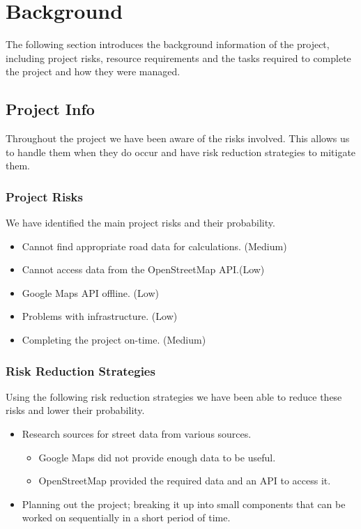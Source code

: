 \documentclass[a4paper,11pt]{article}
\begin{document}
\section{Background}

The following section introduces the background information of the project,
including project risks, resource requirements and the tasks required to
complete the project and how they were managed.

\subsection{Project Info}

Throughout the project we have been aware of the risks involved. This allows us
to handle them when they do occur and have risk reduction strategies to mitigate
them.

\subsubsection{Project Risks}

We have identified the main project risks and their probability.

\begin{itemize}
  \item Cannot find appropriate road data for calculations. (Medium)
  \item Cannot access data from the OpenStreetMap API.\@ (Low)
  \item Google Maps API offline. (Low)
  \item Problems with infrastructure. (Low)
  \item Completing the project on-time. (Medium)
\end{itemize}

\subsubsection{Risk Reduction Strategies}

Using the following risk reduction strategies we have been able to reduce these
risks and lower their probability.

\begin{itemize}
  \item Research sources for street data from various sources.
    \begin{itemize}
      \item Google Maps did not provide enough data to be useful.
      \item OpenStreetMap provided the required data and an API to access it.
    \end{itemize}
  \item Planning out the project; breaking it up into small components that can
    be worked on sequentially in a short period of time.
\end{itemize}
\end{document}
